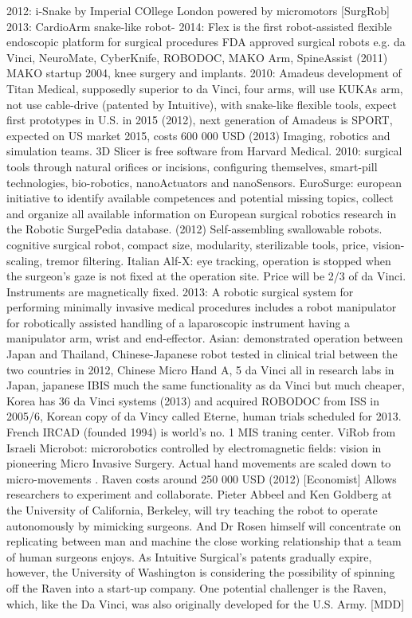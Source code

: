 2012: i-Snake by Imperial COllege London powered by micromotors [SurgRob]
2013: CardioArm snake-like robot-
2014: Flex is the first robot-assisted flexible endoscopic platform for surgical procedures
FDA approved surgical robots e.g. da Vinci, NeuroMate, CyberKnife, ROBODOC, MAKO Arm, SpineAssist (2011)
MAKO startup 2004, knee surgery and implants.
2010: Amadeus development of Titan Medical, supposedly superior to da Vinci, four arms, will use KUKAs arm, not use cable-drive (patented by Intuitive), with snake-like flexible tools, expect first prototypes in U.S. in 2015 (2012), next generation of Amadeus is SPORT, expected on US market 2015, costs 600 000 USD (2013)
Imaging, robotics and simulation teams.
3D Slicer is free software from Harvard Medical.
2010: surgical tools through natural orifices or incisions, configuring themselves, smart-pill technologies, bio-robotics, nanoActuators and nanoSensors.
EuroSurge: european initiative to identify available competences and potential missing topics, collect and organize all available information on European surgical robotics research in the Robotic SurgePedia database. (2012)
Self-assembling swallowable robots.
cognitive surgical robot, compact size, modularity, sterilizable tools, price, vision-scaling, tremor filtering.
Italian Alf-X: eye tracking, operation is stopped when the surgeon's gaze is not fixed at the operation site. Price will be 2/3 of da Vinci. Instruments are magnetically fixed.
2013: A robotic surgical system for performing minimally invasive medical procedures includes a robot manipulator for robotically assisted handling of a laparoscopic instrument having a manipulator arm, wrist and end-effector.
Asian: demonstrated operation between Japan and Thailand, Chinese-Japanese robot tested in clinical trial between the two countries in 2012, Chinese Micro Hand A, 5 da Vinci all in research labs in Japan, japanese IBIS much the same functionality as da Vinci but much cheaper, Korea has 36 da Vinci systems (2013) and acquired ROBODOC from ISS in 2005/6, Korean copy of da Vincy called Eterne, human trials scheduled for 2013.
French IRCAD (founded 1994) is world's no. 1 MIS traning center.
ViRob from Israeli Microbot: microrobotics controlled by electromagnetic fields: vision in pioneering Micro Invasive Surgery.
Actual hand movements are scaled down to micro-movements \citep{bib:intuitive_monopoly}.
Raven costs around 250 000 USD (2012) [Economist] Allows researchers to experiment and collaborate. Pieter Abbeel and Ken Goldberg at the University of California, Berkeley, will try teaching the robot to operate autonomously by mimicking surgeons. And Dr Rosen himself will concentrate on replicating between man and machine the close working relationship that a team of human surgeons enjoys. As Intuitive Surgical's patents gradually expire, however, the University of Washington is considering the possibility of spinning off the Raven into a start-up company.
One potential challenger is the Raven, which, like the Da Vinci, was also originally developed for the U.S. Army. [MDD]

